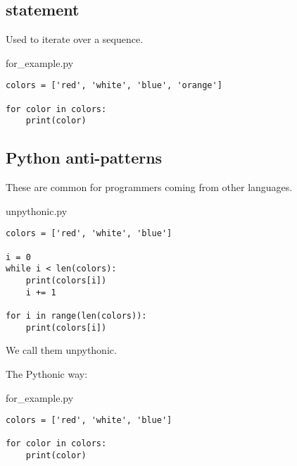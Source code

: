 \documentclass[aspectratio=1610,t]{beamer}
\begin{document}
\subsection{ statement}
\begin{pframe}
 Used to iterate over a sequence.
 \begin{pythonfile}{for\_example.py}
  \begin{verbatim}
colors = ['red', 'white', 'blue', 'orange']

for color in colors:
    print(color)
  \end{verbatim}
 \end{pythonfile}
 \pause
 \begin{terminal}
 \end{terminal}
\end{pframe}


\subsection{Python anti-patterns}
\begin{pframe}
 \begin{minipage}[t]{0.48\textwidth}
  These are common for programmers coming from other languages.
  \begin{pythonfile}{unpythonic.py}
   \begin{verbatim}
colors = ['red', 'white', 'blue']

i = 0
while i < len(colors):
    print(colors[i])
    i += 1

for i in range(len(colors)):
    print(colors[i])
   \end{verbatim}
  \end{pythonfile}
  We call them unpythonic.
 \end{minipage}\qquad%
 \pause
 \begin{minipage}[t]{0.48\textwidth}
  The Pythonic way:
  \begin{pythonfile}{for\_example.py}
   \begin{verbatim}
colors = ['red', 'white', 'blue']

for color in colors:
    print(color)
   \end{verbatim}
  \end{pythonfile}
 \end{minipage}\qquad
\end{pframe}
\end{document}

